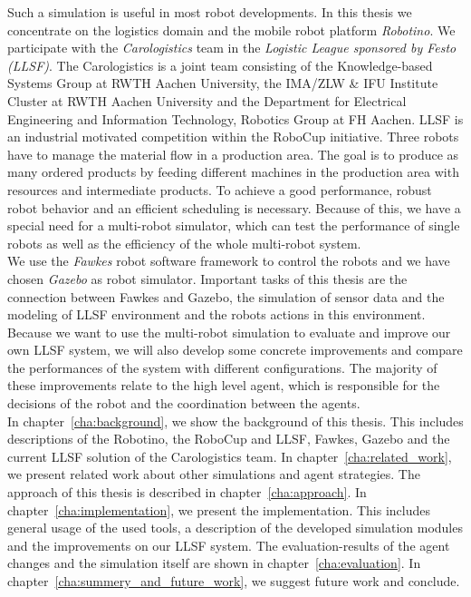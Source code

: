 Such a simulation is useful in most robot developments. In this thesis we concentrate on the logistics domain and the mobile robot platform \textit{Robotino}. We participate with the \textit{Carologistics} team in the \textit{Logistic League sponsored by Festo (LLSF)}. The Carologistics is a joint team consisting of the Knowledge-based Systems Group at RWTH Aachen University, the IMA/ZLW \& IFU Institute Cluster at RWTH Aachen University and the Department for Electrical Engineering and Information Technology, Robotics Group at FH Aachen. LLSF is an industrial motivated competition within the RoboCup initiative. Three robots have to manage the material flow in a production area. The goal is to produce as many ordered products by feeding different machines in the production area with resources and intermediate products. To achieve a good performance, robust robot behavior and an efficient scheduling is necessary. Because of this, we have a special need for a multi-robot simulator, which can test the performance of single robots as well as the efficiency of the whole multi-robot system.\\
We use the \textit{Fawkes} robot software framework to control the robots and we have chosen \textit{Gazebo} as robot simulator. Important tasks of this thesis are the connection between Fawkes and Gazebo, the simulation of sensor data and the modeling of LLSF environment and the robots actions in this environment. Because we want to use the multi-robot simulation to evaluate and improve our own LLSF system, we will also develop some concrete improvements and compare the performances of the system with different configurations. The majority of these improvements relate to the high level agent, which is responsible for the decisions of the robot and the coordination between the agents.
\\
In chapter~\ref{cha:background}, we show the background of this thesis. This includes descriptions of the Robotino, the RoboCup and LLSF, Fawkes, Gazebo and the current LLSF solution of the Carologistics team. In chapter~\ref{cha:related_work}, we present related work about other simulations and agent strategies. The approach of this thesis is described in chapter~\ref{cha:approach}. In chapter~\ref{cha:implementation}, we present the implementation. This includes general usage of the used tools, a description of the developed simulation modules and the improvements on our LLSF system. The evaluation-results of the agent changes and the simulation itself are shown in chapter~\ref{cha:evaluation}. In chapter~\ref{cha:summery_and_future_work}, we suggest future work and conclude.
